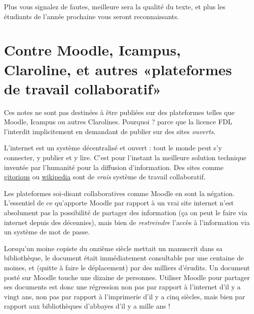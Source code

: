Plus vous signalez de fautes, meilleure sera la qualité du texte, et plus les étudiants de l'année prochaine vous seront reconnaissants.


\section{Contre Moodle, Icampus, Claroline, et autres «plateformes de travail collaboratif»}

Ces notes ne sont pas destinées à être publiées sur des plateformes telles que Moodle, Icampus ou autres Clarolines. Pourquoi ? parce que la licence FDL l'interdit implicitement en demandant de publier sur des sites \emph{ouverts}.

L'internet est un système décentralisé et ouvert : tout le monde peut s'y connecter, y publier et y lire. C'est pour l'instant la meilleure solution technique inventée par l'humanité pour la diffusion d'information. Des sites comme \href{http://gitorious.org}{gitorious} ou \href{http://wikipedia.org}{wikipedia} sont de \emph{vrais} système de travail collaboratif.

Les plateformes soi-disant collaboratives comme Moodle en sont la négation. L'essentiel de ce qu'apporte Moodle par rapport à un vrai site internet n'est absolument pas la possibilité de partager des information (ça on peut le faire via internet depuis des décennies), mais bien de \emph{restreindre} l'accès à l'information via un système de mot de passe.

Lorsqu'un moine copiste du onzième siècle mettait un manuscrit dans sa bibliothèque, le document était immédiatement consultable par une centaine de moines, et (quitte à faire le déplacement) par des milliers d'érudits. Un document posté sur Moodle touche une dizaine de personnes. Utiliser Moodle pour partager ses documents est donc une régression non pas par rapport à l'internet d'il y a vingt ans, non pas par rapport à l'imprimerie d'il y a cinq siècles, mais bien par rapport aux bibliothèques d'abbayes d'il y a mille ans !

